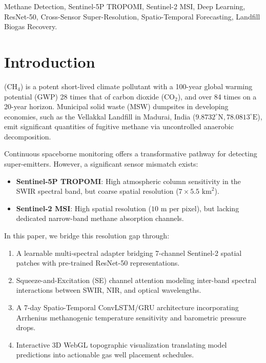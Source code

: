\documentclass[journal]{IEEEtran}
\begin{document}
\begin{IEEEkeywords}
Methane Detection, Sentinel-5P TROPOMI, Sentinel-2 MSI, Deep Learning, ResNet-50, Cross-Sensor Super-Resolution, Spatio-Temporal Forecasting, Landfill Biogas Recovery.
\end{IEEEkeywords}

\section{Introduction}
 ($\text{CH}_4$) is a potent short-lived climate pollutant with a 100-year global warming potential (GWP) 28 times that of carbon dioxide ($\text{CO}_2$), and over 84 times on a 20-year horizon. Municipal solid waste (MSW) dumpsites in developing economies, such as the Vellakkal Landfill in Madurai, India ($9.8732^\circ\text{N}, 78.0813^\circ\text{E}$), emit significant quantities of fugitive methane via uncontrolled anaerobic decomposition.

Continuous spaceborne monitoring offers a transformative pathway for detecting super-emitters. However, a significant sensor mismatch exists:
\begin{itemize}
    \item \textbf{Sentinel-5P TROPOMI}: High atmospheric column sensitivity in the SWIR spectral band, but coarse spatial resolution ($7\times 5.5\text{ km}^2$).
    \item \textbf{Sentinel-2 MSI}: High spatial resolution ($10\text{ m}$ per pixel), but lacking dedicated narrow-band methane absorption channels.
\end{itemize}

In this paper, we bridge this resolution gap through:
\begin{enumerate}
    \item A learnable multi-spectral adapter bridging 7-channel Sentinel-2 spatial patches with pre-trained ResNet-50 representations.
    \item Squeeze-and-Excitation (SE) channel attention modeling inter-band spectral interactions between SWIR, NIR, and optical wavelengths.
    \item A 7-day Spatio-Temporal ConvLSTM/GRU architecture incorporating Arrhenius methanogenic temperature sensitivity and barometric pressure drops.
    \item Interactive 3D WebGL topographic visualization translating model predictions into actionable gas well placement schedules.
\end{enumerate}
\end{document}
